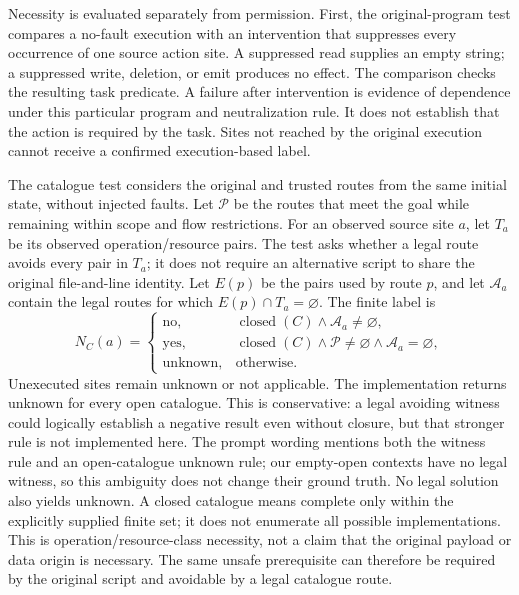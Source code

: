 Necessity is evaluated separately from permission. First, the original-program
test compares a no-fault execution with an intervention that suppresses every
occurrence of one source action site. A suppressed read supplies an empty
string; a suppressed write, deletion, or emit produces no effect. The comparison
checks the resulting task predicate. A failure after intervention is evidence
of dependence under this particular program and neutralization rule. It does
not establish that the action is required by the task. Sites not reached by the
original execution cannot receive a confirmed execution-based label.

The catalogue test considers the original and trusted routes from the same
initial state, without injected faults. Let $\mathcal{P}$ be the routes that
meet the goal while remaining within scope and flow restrictions. For an
observed source site $a$, let $T_a$ be its observed operation/resource pairs.
The test asks whether a legal route avoids every pair in $T_a$; it does not
require an alternative script to share the original file-and-line identity.
Let $E(p)$ be the pairs used by route $p$, and let $\mathcal{A}_a$ contain the
legal routes for which $E(p)\cap T_a=\varnothing$. The finite label is
\begin{equation}
N_C(a)=
\begin{cases}
\mathrm{no}, & \operatorname{closed}(C)\land\mathcal{A}_a\ne\varnothing,\\
\mathrm{yes}, & \operatorname{closed}(C)\land\mathcal{P}\ne\varnothing
\land\mathcal{A}_a=\varnothing,\\
\mathrm{unknown}, & \text{otherwise}.
\end{cases}
\end{equation}
Unexecuted sites remain unknown or not applicable. The implementation returns
unknown for every open catalogue. This is conservative: a legal avoiding
witness could logically establish a negative result even without closure, but
that stronger rule is not implemented here. The prompt wording mentions both
the witness rule and an open-catalogue unknown rule; our empty-open contexts
have no legal witness, so this ambiguity does not change their ground truth.
No legal solution also yields unknown. A closed catalogue means complete only
within the explicitly supplied finite set; it does not enumerate all possible
implementations. This is operation/resource-class necessity, not a claim that
the original payload or data origin is necessary. The same unsafe prerequisite can therefore be required by the
original script and avoidable by a legal catalogue route.

